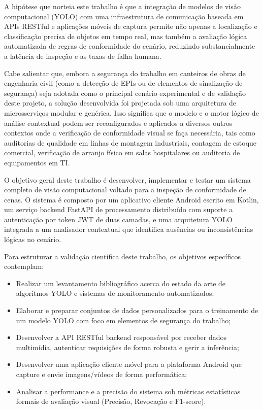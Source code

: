 A hipótese que norteia este trabalho é que a integração de modelos de visão computacional (YOLO) com uma infraestrutura de comunicação baseada em APIs RESTful e aplicações móveis de captura permite não apenas a localização e classificação precisa de objetos em tempo real, mas também a avaliação lógica automatizada de regras de conformidade do cenário, reduzindo substancialmente a latência de inspeção e as taxas de falha humana.

Cabe salientar que, embora a segurança do trabalho em canteiros de obras de engenharia civil (como a detecção de EPIs ou de elementos de sinalização de segurança) seja adotada como o principal cenário experimental e de validação deste projeto, a solução desenvolvida foi projetada sob uma arquitetura de microsserviços modular e genérica. Isso significa que o modelo e o motor lógico de análise contextual podem ser reconfigurados e aplicados a diversos outros contextos onde a verificação de conformidade visual se faça necessária, tais como auditorias de qualidade em linhas de montagem industriais, contagem de estoque comercial, verificação de arranjo físico em salas hospitalares ou auditoria de equipamentos em TI.

O objetivo geral deste trabalho é desenvolver, implementar e testar um sistema completo de visão computacional voltado para a inspeção de conformidade de cenas. O sistema é composto por um aplicativo cliente Android escrito em Kotlin, um serviço backend FastAPI de processamento distribuído com suporte a autenticação por token JWT de duas camadas, e uma arquitetura YOLO integrada a um analisador contextual que identifica ausências ou inconsistências lógicas no cenário.

Para estruturar a validação científica deste trabalho, os objetivos específicos contemplam:
\begin{itemize}
    \item Realizar um levantamento bibliográfico acerca do estado da arte de algoritmos YOLO e sistemas de monitoramento automatizados;
    \item Elaborar e preparar conjuntos de dados personalizados para o treinamento de um modelo YOLO com foco em elementos de segurança do trabalho;
    \item Desenvolver a API RESTful backend responsável por receber dados multimídia, autenticar requisições de forma robusta e gerir a inferência;
    \item Desenvolver uma aplicação cliente móvel para a plataforma Android que capture e envie imagens/vídeos de forma performática;
    \item Analisar a performance e a precisão do sistema sob métricas estatísticas formais de avaliação visual (Precisão, Revocação e F1-score).
\end{itemize}
